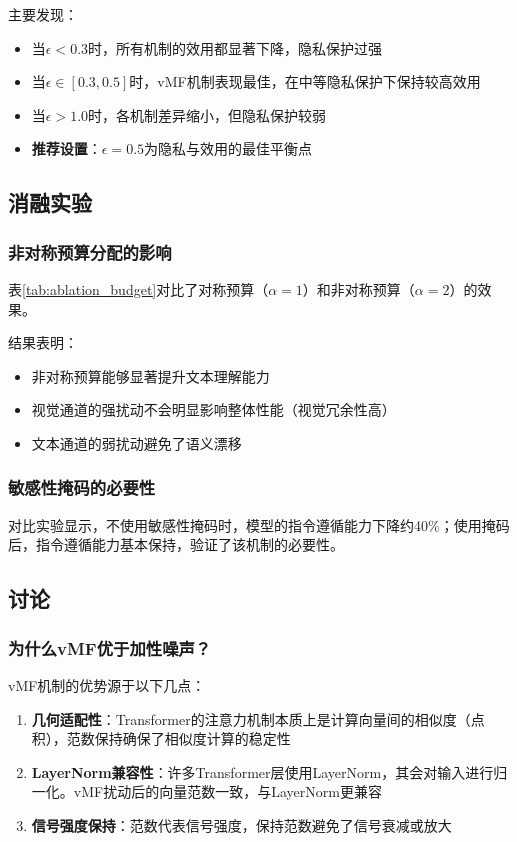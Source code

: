 \documentclass[a4paper,12pt]{article}
\begin{document}
主要发现：
\begin{itemize}
  \item 当$\epsilon < 0.3$时，所有机制的效用都显著下降，隐私保护过强
  \item 当$\epsilon \in [0.3, 0.5]$时，vMF机制表现最佳，在中等隐私保护下保持较高效用
  \item 当$\epsilon > 1.0$时，各机制差异缩小，但隐私保护较弱
  \item \textbf{推荐设置}：$\epsilon = 0.5$为隐私与效用的最佳平衡点
\end{itemize}

\subsection{消融实验}

\subsubsection{非对称预算分配的影响}

表\ref{tab:ablation_budget}对比了对称预算（$\alpha=1$）和非对称预算（$\alpha=2$）的效果。

结果表明：
\begin{itemize}
  \item 非对称预算能够显著提升文本理解能力
  \item 视觉通道的强扰动不会明显影响整体性能（视觉冗余性高）
  \item 文本通道的弱扰动避免了语义漂移
\end{itemize}

\subsubsection{敏感性掩码的必要性}

对比实验显示，不使用敏感性掩码时，模型的指令遵循能力下降约40\%；使用掩码后，指令遵循能力基本保持，验证了该机制的必要性。

\subsection{讨论}

\subsubsection{为什么vMF优于加性噪声？}

vMF机制的优势源于以下几点：
\begin{enumerate}
  \item \textbf{几何适配性}：Transformer的注意力机制本质上是计算向量间的相似度（点积），范数保持确保了相似度计算的稳定性
  \item \textbf{LayerNorm兼容性}：许多Transformer层使用LayerNorm，其会对输入进行归一化。vMF扰动后的向量范数一致，与LayerNorm更兼容
  \item \textbf{信号强度保持}：范数代表信号强度，保持范数避免了信号衰减或放大
\end{enumerate}
\end{document}
